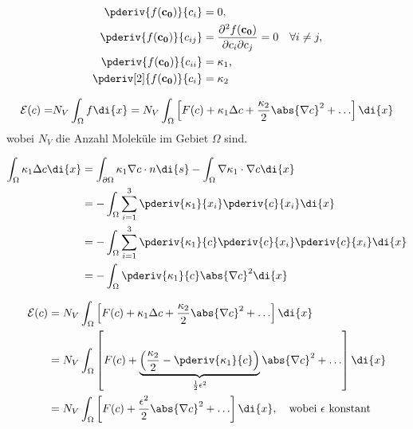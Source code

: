 
\begin{align*}
\pderiv{f(\mathbf{c_0})}{c_i}
&=
0,
\\
\pderiv{f(\mathbf{c_0})}{c_{ij}}
&=
\frac{\partial^2 f(\mathbf{c_0})}{\partial c_i \partial c_j}
=
0
\quad \forall i \neq j,
\\
\pderiv{f(\mathbf{c_0})}{c_{ii}}
&=
\kappa_1,
\\
 \pderiv[2]{f(\mathbf{c_0})}{c_i}
&=
\kappa_2
\end{align*}

\begin{align*}
\mathcal{E}(c)
=
&N_V \int_\Omega f\di{x}
=
N_V \int_\Omega \left[
F(c) + \kappa_1 \Delta c + \frac{\kappa_2}{2} \abs{\nabla c}^2  + \ldots
\right]\di{x}
\\
\end{align*}
wobei $N_V$ die Anzahl Moleküle im Gebiet $\Omega$ sind.

\begin{align*}
\int_\Omega \kappa_1 \Delta c \di{x}
&=
\int_{\partial\Omega} \kappa_1 \nabla c \cdot n \di{s}
- \int_\Omega \nabla \kappa_1 \cdot \nabla c \di{x}
\\
&=-\int_\Omega \sum_{i=1}^3 \pderiv{\kappa_1}{x_i} \pderiv{c}{x_i} \di{x}
\\
&=-\int_\Omega \sum_{i=1}^3 \pderiv{\kappa_1}{c} \pderiv{c}{x_i} \pderiv{c}{x_i} \di{x}
\\
&=
-\int_\Omega \pderiv{\kappa_1}{c} \abs{\nabla c}^2 \di{x}
\end{align*}

\begin{align}
\mathcal{E}(c)
&=
N_V \int_\Omega \left[
F(c) + \kappa_1 \Delta c + \frac{\kappa_2}{2} \abs{\nabla c}^2  + \ldots
\right]\di{x}
\nonumber
\\
&=
N_V \int_\Omega \left[
  F(c) + \underbrace{\left( \frac{\kappa_2}{2} - \pderiv{\kappa_1}{c} \right)}_{\frac{1}{2}\epsilon^2} \abs{\nabla c}^2  + \ldots
\right]\di{x}
\nonumber
\\
&=
N_V \int_\Omega \left[
  F(c) + \frac{\epsilon^2}{2} \abs{\nabla c}^2  + \ldots
\right]\di{x}
,\quad
\text{wobei $\epsilon$ konstant}
\label{cahnhilliard:energy}
\end{align}
